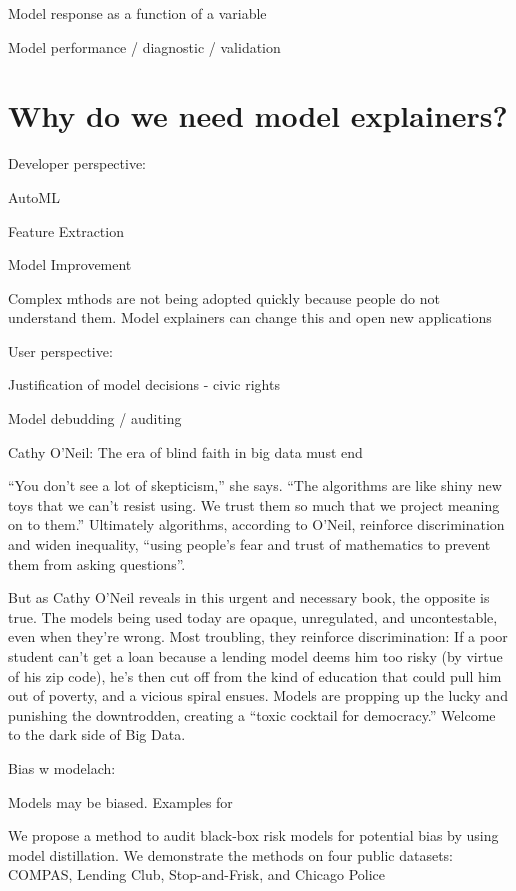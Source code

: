 \documentclass[]{book}
\theoremstyle{definition}
\theoremstyle{definition}
\theoremstyle{definition}
\theoremstyle{remark}
\begin{document}
Model response as a function of a variable

Model performance / diagnostic / validation

\hypertarget{why-do-we-need-model-explainers}{%
\section{Why do we need model
explainers?}\label{why-do-we-need-model-explainers}}

Developer perspective:

AutoML

Feature Extraction

Model Improvement

Complex mthods are not being adopted quickly because people do not
understand them. Model explainers can change this and open new
applications

User perspective:

Justification of model decisions - civic rights

Model debudding / auditing

\citep{ONeil}

Cathy O'Neil: The era of blind faith in big data must end

``You don't see a lot of skepticism,'' she says. ``The algorithms are
like shiny new toys that we can't resist using. We trust them so much
that we project meaning on to them.'' Ultimately algorithms, according
to O'Neil, reinforce discrimination and widen inequality, ``using
people's fear and trust of mathematics to prevent them from asking
questions''.

But as Cathy O'Neil reveals in this urgent and necessary book, the
opposite is true. The models being used today are opaque, unregulated,
and uncontestable, even when they're wrong. Most troubling, they
reinforce discrimination: If a poor student can't get a loan because a
lending model deems him too risky (by virtue of his zip code), he's then
cut off from the kind of education that could pull him out of poverty,
and a vicious spiral ensues. Models are propping up the lucky and
punishing the downtrodden, creating a ``toxic cocktail for democracy.''
Welcome to the dark side of Big Data.

Bias w modelach:

\citep{2017arXiv171107076L}

Models may be biased. Examples for \citep{2017arXiv171006169T}

We propose a method to audit black-box risk models for potential bias by
using model distillation. We demonstrate the methods on four public
datasets: COMPAS, Lending Club, Stop-and-Frisk, and Chicago Police
\end{document}
